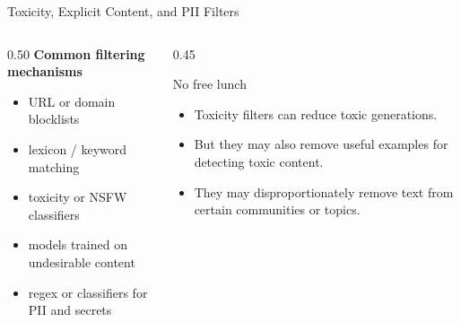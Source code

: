 \documentclass[aspectratio=169]{beamer}
\begin{document}
\begin{frame}{Toxicity, Explicit Content, and PII Filters}

\begin{columns}[T,totalwidth=\textwidth]

\begin{column}{0.50\textwidth}
\textbf{Common filtering mechanisms}
\begin{itemize}
  \item URL or domain blocklists
  \item lexicon / keyword matching
  \item toxicity or NSFW classifiers
  \item models trained on undesirable content
  \item regex or classifiers for PII and secrets
\end{itemize}
\end{column}

\begin{column}{0.45\textwidth}
\begin{alertblock}{No free lunch}
\begin{itemize}
  \item Toxicity filters can reduce toxic generations.
  \item But they may also remove useful examples for detecting toxic content.
  \item They may disproportionately remove text from certain communities or topics.
\end{itemize}
\end{alertblock}
\end{column}

\end{columns}

\vspace{0.5em}

\begin{center}
\end{center}

\end{frame}
\end{document}
